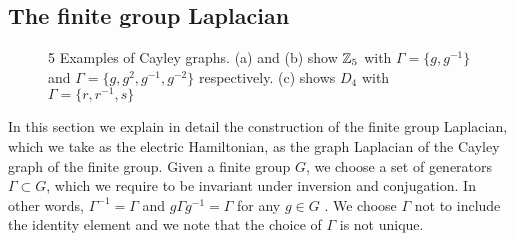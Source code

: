 \subsection{The finite group Laplacian}%
\label{sub:the_finite_group_laplacian}

\begin{figure}
    \centering
    
    \caption[Examples of Cayley graphs]{5
        Examples of Cayley graphs.
        (a) and (b) show $\mathbb{Z}_5$ with $\Gamma = \{g,g^{-1}\}$ and $\Gamma = \{g,g^2, g^{-1}, g^{-2}\}$ respectively.
        (c) shows $D_4$ with $\Gamma = \{r,r^{-1}, s\}$ }
    \label{fig:examples of Cayley graphs}
\end{figure}

In this section we explain in detail the construction of the finite group Laplacian, which we take as the electric Hamiltonian, as the graph Laplacian of the Cayley graph of the finite group.
Given a finite group $G$, we choose a set of generators $\Gamma \subset G$, which we require to be invariant under inversion and conjugation.
In other words, $\Gamma^{-1}= \Gamma$ and $g \Gamma g^{-1} = \Gamma$ for any $g\in G$ \cite{spectralgraphtheory}.
We choose $\Gamma$ not to include the identity element and we note that the choice of $\Gamma$ is not unique.

